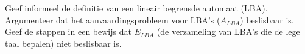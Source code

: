 \begin{question}
	Geef informeel de definitie van een lineair begrensde automaat (LBA). Argumenteer dat het aanvaardingsprobleem voor LBA's ($A_{LBA}$) beslisbaar is. Geef de stappen in een bewijs dat $E_{LBA}$ (de verzameling van LBA's die de lege taal bepalen) niet beslisbaar is.
\end{question}